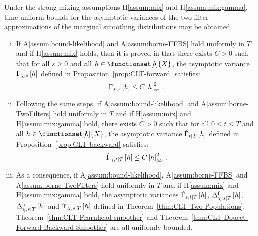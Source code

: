 \begin{rem}
Under the strong mixing assumptions H\ref{assum:mix} and H\ref{assum:mix:gamma}, time uniform bounds for the asymptotic variances of  the two-filter approximations of the marginal smoothing distributions may be obtained.
\begin{enumerate}[(i)]
\item If A\ref{assum:bound-likelihood} and A\ref{assum:borne-FFBS} hold uniformly in $T$ and if H\ref{assum:mix} holds, then it is proved in \cite{douc:garivier:moulines:olsson:2011} that there exists $C>0$ such that for all $s \geq 0$ and all $h \in \functionset[b]{X}$, the asymptotic variance $\asymVar[\Xinit]{s}{h}$ defined in Proposition~\ref{prop:CLT-forward} satisfies:
\[
\asymVar[\Xinit]{s}{h} \le C \esssup{h}^2\eqsp.
\]
\item Following the same steps, if A\ref{assum:bound-likelihood} and A\ref{assum:borne-TwoFilters} hold uniformly in $T$  and if H\ref{assum:mix} and H\ref{assum:mix:gamma} hold, there exists $C>0$ such that for all $0\le t\le T$ and all $h \in \functionset[b]{X}$, the asymptotic variance $\backasymVar{t}{T}{h}$ defined in Proposition~\ref{prop:CLT-backward} satisfies:
\[
\backasymVar[\gamma]{t}{T}{h}\le C \esssup{h}^2\eqsp.
\]
\item As a consequence, if A\ref{assum:bound-likelihood}, A\ref{assum:borne-FFBS} and A\ref{assum:borne-TwoFilters} hold uniformly in $T$  and  if H\ref{assum:mix} and H\ref{assum:mix:gamma} hold, the asymptotic variances $\asymVarJoint{s,t}{T}{h}$, $\asymVarDoucet[\Xinit]{\forward}{s}{T}{h}$, $\asymVarDoucet[\Xinit]{\backward}{s}{T}{h}$ and $\asymVarFearnhead[\Xinit]{s}{T}{h}$ defined in Theorem~\ref{thm:CLT-Two-Populations}, Theorem~\ref{thm:CLT-Fearnhead-smoother}  and Theorem~\ref{thm:CLT-Doucet-Forward-Backward-Smoother} are all uniformly bounded.
\end{enumerate}
\end{rem} 